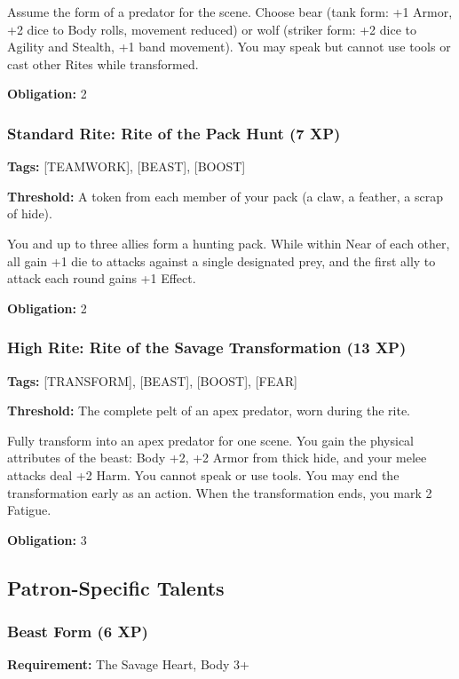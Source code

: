 Assume the form of a predator for the scene. Choose bear (tank form: +1 Armor, +2 dice to Body rolls, movement reduced) or wolf (striker form: +2 dice to Agility and Stealth, +1 band movement). You may speak but cannot use tools or cast other Rites while transformed.

\textbf{Obligation:} 2

\subsubsection{Standard Rite: Rite of the Pack Hunt (7 XP)}

\textbf{Tags:} [TEAMWORK], [BEAST], [BOOST]

\textbf{Threshold:} A token from each member of your pack (a claw, a feather, a scrap of hide).

You and up to three allies form a hunting pack. While within Near of each other, all gain +1 die to attacks against a single designated prey, and the first ally to attack each round gains +1 Effect.

\textbf{Obligation:} 2

\subsubsection{High Rite: Rite of the Savage Transformation (13 XP)}

\textbf{Tags:} [TRANSFORM], [BEAST], [BOOST], [FEAR]

\textbf{Threshold:} The complete pelt of an apex predator, worn during the rite.

Fully transform into an apex predator for one scene. You gain the physical attributes of the beast: Body +2, +2 Armor from thick hide, and your melee attacks deal +2 Harm. You cannot speak or use tools. You may end the transformation early as an action. When the transformation ends, you mark 2 Fatigue.

\textbf{Obligation:} 3

\subsection{Patron-Specific Talents}

\subsubsection{Beast Form (6 XP)}

\textbf{Requirement:} The Savage Heart, Body 3+

